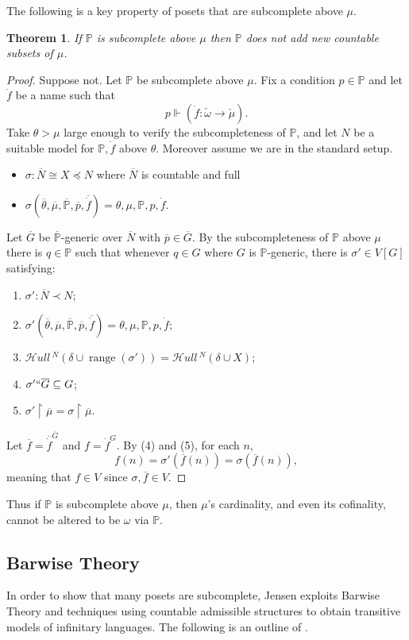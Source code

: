 \documentclass{amsart}
\newtheorem{theorem}{Theorem}[section]
\theoremstyle{definition}
\theoremstyle{remark}
\renewcommand{\P}{\mathbb{P}}
\newcommand{\N}{{\overline{N}}}
\newcommand{\G}{\overline{G}}
\DeclareMathOperator{\ran}{range}
\newcommand{\forces}{\Vdash}
\newcommand{\rest}{\mathbin{\upharpoonright}}
\newcommand{\SH}{\mathcal{H}\textit{ull} \,}
\newcommand{\sk}[3]{\SH^{#1}( {#2} \cup {\ran(#3)} ) }
\newcommand{\Sk}[3]{\SH^{#1}( {#2} \cup {#3} ) }
\begin{document}
The following is a key property of posets that are subcomplete above \(\mu\).
\begin{theorem} If $\P$ is subcomplete above $\mu$ then $\P$ does not add new countable subsets of $\mu$. \end{theorem}
\begin{proof}
Suppose not. Let $\P$ be subcomplete above $\mu$. 
Fix a condition \(p\in\P\) and let $\dot{f}$ be a name such that
	$$p \forces \left( \dot f: \check \omega \to \check{\mu} \right).$$ 
Take $\theta > \mu$ large enough to verify the subcompleteness of $\P$, and let $N$ be a suitable model for $\P, \dot f$ above $\theta$. Moreover assume we are in the standard setup.
\begin{itemize}
	\item $\sigma: \N \cong X \preccurlyeq N$ where $\N$ is countable and full
	\item $\sigma(\overline \theta, \overline \mu, \overline{\P}, \overline p, \overline{\dot f})=\theta, \mu, \P, p, \dot f$.
\end{itemize}
Let $\G$ be $\overline{\P}$-generic over $\N$ with $\overline p \in \overline G$. By the subcompleteness of $\P$ above $\mu$ there is $q \in \P$ such that whenever $q \in G$ where $G$ is $\P$-generic, there is $\sigma' \in V[G]$ satisfying: \begin{enumerate}
	\item $\sigma': \N \prec N$;
	\item $\sigma'(\overline \theta, \overline \mu, \overline{\P}, \overline p, \overline{\dot f})=\theta, \mu, \P, p, \dot f$;
	\item $\sk{N}{\delta}{\sigma'} = \Sk{N}{\delta}{X}$;
	\item $\sigma'``\G \subseteq G$;
	\item $\sigma' \rest \overline \mu = \sigma \rest \overline \mu$.
\end{enumerate}
Let $\overline f = \overline{\dot f}^{\G}$ and $f = \dot f^G$. By (4) and (5), for each $n$, $$f(n)=\sigma'(\overline f(n)) = \sigma(\overline f(n)),$$ meaning that $f \in V$ since $\sigma,\overline{f} \in V$.
\end{proof}
Thus if $\P$ is subcomplete above $\mu$, then $\mu$'s cardinality, and even its cofinality, cannot be altered to be $\omega$ via $\P$.



\subsection{Barwise Theory}
\label{subsec:BarwiseTheory}
In order to show that many posets are subcomplete, Jensen exploits Barwise Theory and techniques using countable admissible structures to obtain transitive models of infinitary languages.  The following is an outline of \cite[Chapter 1 \& 2]{Jensen:2012fr}. 
\end{document}
